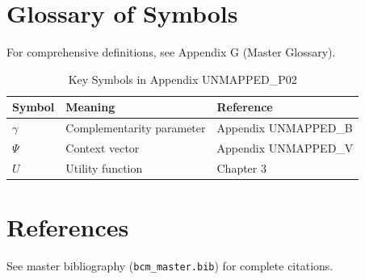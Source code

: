 \section{Glossary of Symbols}
\label{sec:p02-glossary}

For comprehensive definitions, see Appendix G (Master Glossary).

\begin{table}[htbp]
\centering
\caption{Key Symbols in Appendix UNMAPPED_P02}
\begin{tabular}{lll}
\toprule
\textbf{Symbol} & \textbf{Meaning} & \textbf{Reference} \\
\midrule
$\gamma$ & Complementarity parameter & Appendix UNMAPPED_B \\
$\Psi$ & Context vector & Appendix UNMAPPED_V \\
$U$ & Utility function & Chapter 3 \\
\bottomrule
\end{tabular}
\end{table}


\section{References}
\label{sec:p02-references}

See master bibliography (\texttt{bcm\_master.bib}) for complete citations.

\nocite{bcm_master}

